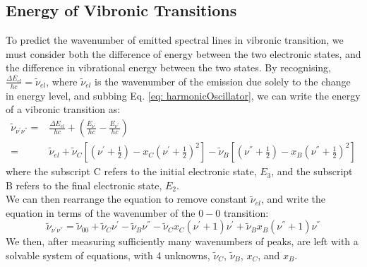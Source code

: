 \documentclass{article}
\begin{document}
\subsection{Energy of Vibronic Transitions}
To predict the wavenumber of emitted spectral lines in vibronic transition, we must consider both the difference of energy between the two electronic states, and the difference in vibrational energy between the two states. By recognising, $\frac{\Delta E_{el}}{hc} = \tilde{\nu}_{el}$, where $\tilde{\nu}_{el}$ is the wavenumber of the emission due solely to the change in energy level, and subbing Eq. \ref{eq: harmonicOscillator}, we can write the energy of a vibronic transition as:
\begin{align}
    \tilde{\nu}_{\nu^{\prime}\nu^{''}} =& \frac{\Delta E_{el}}{hc}+\left(\frac{E_{\nu^{\prime}}}{hc}-\frac{E_{\nu^{''}}}{hc}\right)\\
    =& \tilde{\nu}_{el} + \tilde{\nu}_C\left[\left(\nu^{\prime}+\frac{1}{2}\right)-x_C\left(\nu^{\prime}+\frac{1}{2}\right)^2\right]-\tilde{\nu}_B\left[\left(\nu^{''}+\frac{1}{2}\right)-x_B\left(\nu^{''}+\frac{1}{2}\right)^2\right]
\end{align}
where the subscript C refers to the initial electronic state, $E_3$, and the subscript B refers to the final electronic state, $E_2$.\\
\indent We can then rearrange the equation to remove constant $\tilde{\nu}_{el}$, and write the equation in terms of the wavenumber of the $0-0$ transition:
\begin{equation}
    \tilde{\nu}_{\nu^{\prime}\nu^{''}} = \tilde{\nu}_{00} + \tilde{\nu}_C\nu^{\prime} - \tilde{\nu}_B\nu^{''} - \tilde{\nu}_Cx_C(\nu^{\prime}+1)\nu^{\prime} + \tilde{\nu}_Bx_B(\nu^{''}+1)\nu^{''}
\end{equation}
\indent We then, after measuring sufficiently many wavenumbers of peaks, are left with a solvable system of equations, with 4 unknowns, $\tilde{\nu}_C$, $\tilde{\nu}_B$, $x_C$, and $x_B$.
\end{document}
